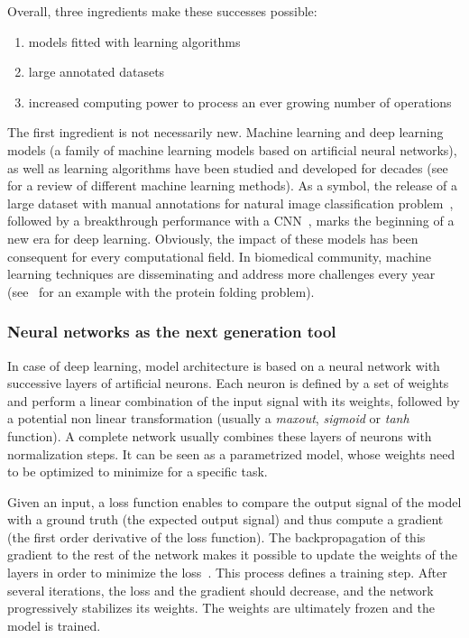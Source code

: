 \noindent
Overall, three ingredients make these successes possible:
\begin{enumerate}
	\setlength\itemsep{0.1em}
	\item models fitted with learning algorithms
	\item large annotated datasets
	\item increased computing power to process an ever growing number of operations
\end{enumerate}

\noindent
The first ingredient is not necessarily new.
Machine learning and deep learning models (a family of machine learning models based on artificial neural networks), as well as learning algorithms have been studied and developed for decades (see~\cite{Bishop_2006, Tibshirani_2009} for a review of different machine learning methods).
As a symbol, the release of a large dataset with manual annotations for natural image classification problem~\cite{Deng_2009}, followed by a breakthrough performance with a \ac{CNN}~\cite{alexnet_2012}, marks the beginning of a new era for deep learning.
Obviously, the impact of these models has been consequent for every computational field.
In biomedical community, machine learning techniques are disseminating and address more challenges every year (see~\cite{jumper_highly_2021} for an example with the protein folding problem).

\subsubsection{Neural networks as the next generation tool}

In case of deep learning, model architecture is based on a neural network with successive layers of artificial neurons.
Each neuron is defined by a set of weights and perform a linear combination of the input signal with its weights, followed by a potential non linear transformation (usually a \emph{maxout}, \emph{sigmoid} or \emph{tanh} function).
A complete network usually combines these layers of neurons with normalization steps.
It can be seen as a parametrized model, whose weights need to be optimized to minimize for a specific task.

Given an input, a loss function enables to compare the output signal of the model with a ground truth (the expected output signal) and thus compute a gradient (the first order derivative of the loss function).
The backpropagation of this gradient to the rest of the network makes it possible to update the weights of the layers in order to minimize the loss~\cite{rumelhart_learning_1986}.
This process defines a training step.
After several iterations, the loss and the gradient should decrease, and the network progressively stabilizes its weights.
The weights are ultimately frozen and the model is trained.

